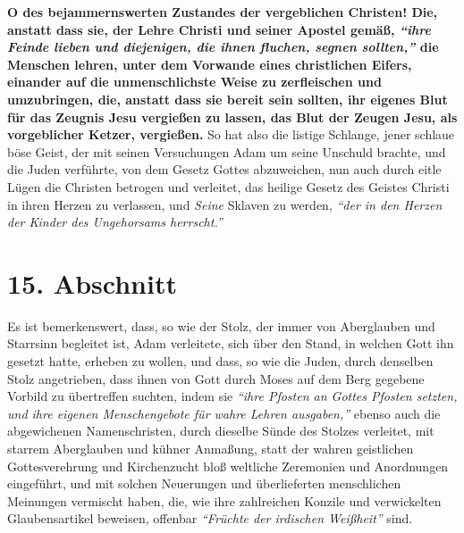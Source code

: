\label{ref:07_14_ketzer}
\textbf{O des bejammernswerten Zustandes der vergeblichen Christen! Die, anstatt
dass
sie, der Lehre Christi und seiner Apostel gemäß,
\textit{"`ihre Feinde lieben und
diejenigen, die ihnen fluchen, segnen sollten,"'}
die Menschen lehren, unter dem
Vorwande eines christlichen Eifers, einander auf die unmenschlichste Weise zu
zerfleischen und umzubringen, die, anstatt
dass sie bereit sein sollten, ihr
eigenes Blut für das Zeugnis Jesu vergießen zu lassen, das Blut der Zeugen Jesu,
als vorgeblicher Ketzer, vergießen.} So hat also die
listige Schlange, jener
schlaue böse Geist, der mit seinen Versuchungen Adam um
seine Unschuld
brachte, und die Juden verführte, von dem Gesetz
Gottes abzuweichen, nun
auch durch eitle Lügen die Christen betrogen und
verleitet, das heilige
Gesetz des Geistes Christi in ihren Herzen zu
verlassen, und \textit{Seine}
Sklaven zu werden,
\textit{"`der in den Herzen der Kinder des Ungehorsams
herrscht."'}

\section{15. Abschnitt} \label{kap7_ab15}

Es ist bemerkenswert, dass, so wie der Stolz, der immer von
Aberglauben und
Starrsinn begleitet ist, Adam verleitete,
sich über den Stand, in welchen
Gott ihn gesetzt hatte, erheben zu wollen, und dass, so wie die
Juden, durch
denselben Stolz angetrieben, dass ihnen von Gott durch
Moses auf dem Berg
gegebene Vorbild zu übertreffen suchten, indem sie
\textit{"`ihre Pfosten an Gottes
Pfosten setzten, und ihre eigenen Menschengebote für wahre Lehren
ausgaben,"'}
ebenso auch die
abgewichenen Namenschristen, durch dieselbe
Sünde
des Stolzes verleitet, mit
starrem Aberglauben und kühner Anmaßung, statt
der wahren geistlichen
Gottesverehrung und Kirchenzucht
bloß weltliche Zeremonien und Anordnungen
eingeführt, und mit solchen Neuerungen und überlieferten menschlichen Meinungen
vermischt haben, die, wie ihre zahlreichen Konzile und
verwickelten
Glaubensartikel beweisen, offenbar
\textit{"`Früchte der irdischen Weißheit"'} sind.

